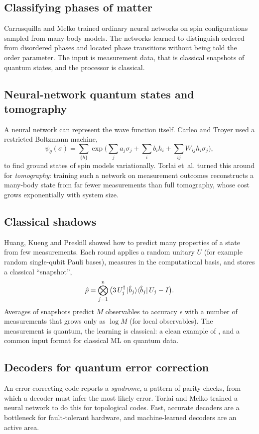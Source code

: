 \documentclass[11pt,a4paper]{article}
\begin{document}
\subsection{Classifying phases of matter}
Carrasquilla and Melko \citeyearpar{carrasquilla2017} trained ordinary neural networks on spin
configurations sampled from many-body models. The networks learned to distinguish ordered from
disordered phases and located phase transitions without being told the order parameter. The input
is measurement data, that is classical snapshots of quantum states, and the processor is classical.

\subsection{Neural-network quantum states and tomography}
A neural network can represent the wave function itself. Carleo and Troyer \citeyearpar{carleo2017} used a
restricted Boltzmann machine,
\begin{equation}
  \psi_\theta(\sigma)=\sum_{\{h\}}\exp\Big(\sum_ja_j\sigma_j+\sum_ib_ih_i+\sum_{ij}W_{ij}h_i\sigma_j\Big),
\end{equation}
to find ground states of spin models variationally. Torlai et~al. \citeyearpar{torlai2018} turned this around
for \emph{tomography}: training such a network on measurement outcomes reconstructs a many-body state
from far fewer measurements than full tomography, whose cost grows exponentially with system size.

\subsection{Classical shadows}
Huang, Kueng and Preskill \citeyearpar{huang2020shadows} showed how to predict many properties of a state
from few measurements. Each round applies a random unitary $U$ (for example random single-qubit Pauli
bases), measures in the computational basis, and stores a classical ``snapshot'',
\begin{equation}
  \hat\rho=\bigotimes_{j=1}^{n}\big(3\,U_j^\dagger\ket{\hat b_j}\!\bra{\hat b_j}U_j-I\big).
\end{equation}
Averages of snapshots predict $M$ observables to accuracy $\epsilon$ with a number of measurements
that grows only as $\log M$ (for local observables). The measurement is quantum, the learning is
classical: a clean example of \QC, and a common input format for classical ML on quantum data.

\subsection{Decoders for quantum error correction}
An error-correcting code reports a \emph{syndrome}, a pattern of parity checks, from which a decoder
must infer the most likely error. Torlai and Melko \citeyearpar{torlai2017decoder} trained a neural network
to do this for topological codes. Fast, accurate decoders are a bottleneck for fault-tolerant hardware,
and machine-learned decoders are an active area.
\end{document}
